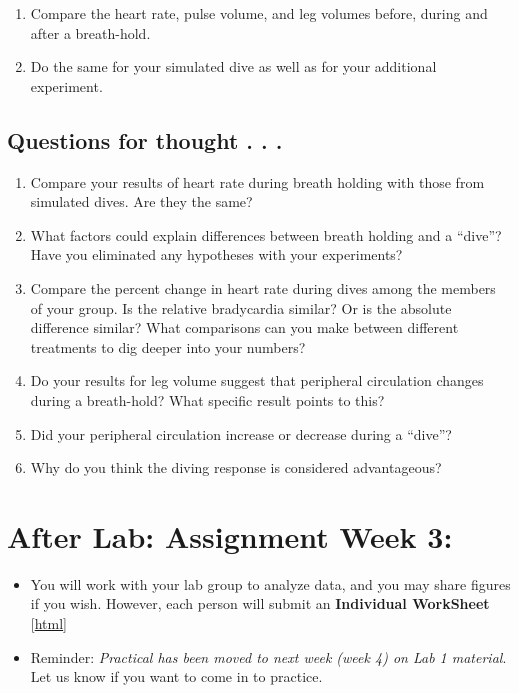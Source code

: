 \documentclass[
  letterpaper,
  DIV=11,
  numbers=noendperiod,
  oneside]{scrartcl}
\providecommand{\tightlist}{%
  \setlength{\itemsep}{0pt}\setlength{\parskip}{0pt}}\usepackage{longtable,booktabs,array}
\begin{document}
\begin{enumerate}
\def\labelenumi{\arabic{enumi}.}
\tightlist
\item
  Compare the heart rate, pulse volume, and leg volumes before, during
  and after a breath-hold.
\item
  Do the same for your simulated dive as well as for your additional
  experiment.
\end{enumerate}

\hypertarget{questions-for-thought-.-.-.}{%
\subsection{Questions for thought . .
.}\label{questions-for-thought-.-.-.}}

\begin{enumerate}
\def\labelenumi{\arabic{enumi}.}
\tightlist
\item
  Compare your results of heart rate during breath holding with those
  from simulated dives. Are they the same?
\item
  What factors could explain differences between breath holding and a
  ``dive''? Have you eliminated any hypotheses with your experiments?
\item
  Compare the percent change in heart rate during dives among the
  members of your group. Is the relative bradycardia similar? Or is the
  absolute difference similar? What comparisons can you make between
  different treatments to dig deeper into your numbers?
\item
  Do your results for leg volume suggest that peripheral circulation
  changes during a breath-hold? What specific result points to this?
\item
  Did your peripheral circulation increase or decrease during a
  ``dive''?
\item
  Why do you think the diving response is considered advantageous?
\end{enumerate}

\hypertarget{after-lab-assignment-week-3}{%
\section{After Lab: Assignment Week
3:}\label{after-lab-assignment-week-3}}

\begin{itemize}
\tightlist
\item
  You will work with your lab group to analyze data, and you may share
  figures if you wish. However, each person will submit an
  \textbf{Individual WorkSheet} {[}\href{Lab3ws.qmd}{html}{]}
\item
  Reminder: \emph{Practical has been moved to next week (week 4) on Lab
  1 material}. Let us know if you want to come in to practice.
\end{itemize}
\end{document}
